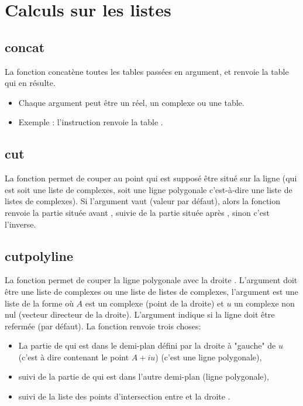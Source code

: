 \section{Calculs sur les listes}

\subsection{concat}

La fonction  concatène toutes les tables passées en argument, et renvoie la table qui en résulte.

\begin{itemize}
 \item Chaque argument peut être un réel, un complexe ou une table.
\item Exemple : l'instruction  renvoie la table .
\end{itemize}

\subsection{cut}

La fonction  permet de couper  au point  qui est supposé être situé sur la ligne  (qui est soit une liste de complexes, soit une ligne polygonale c'est-à-dire une liste de listes de complexes). Si l'argument  vaut \false (valeur par défaut), alors la fonction renvoie la partie située avant , suivie de la partie située après , sinon c'est l'inverse.

\subsection{cutpolyline}

La fonction  permet de couper la ligne polygonale  avec la droite . L'argument  doit être une liste de complexes ou une liste de listes de complexes, l'argument  est une liste de la forme  où $A$ est un complexe (point de la droite) et $u$ un complexe non nul (vecteur directeur de la droite). L'argument  indique si la ligne  doit être refermée (\false par défaut). La fonction renvoie trois choses:
\begin{itemize}
    \item La partie de  qui est dans le demi-plan défini par la droite à "gauche" de $u$ (c'est à dire contenant le point $A+iu$) (c'est une ligne polygonale),
    \item suivi de la partie de  qui est dans l'autre demi-plan (ligne polygonale),
    \item suivi de la liste des points d'intersection entre  et la droite .
\end{itemize}

